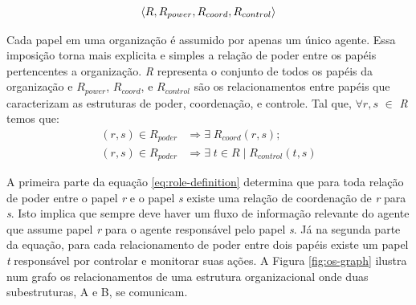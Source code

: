         \begin{equation}
            \centering
            \label{eq:os-structure}
            \langle  R, R_{power}, R_{coord}, R_{control}  \rangle
        \end{equation}
        
        Cada papel em uma organização é assumido por apenas um único agente. Essa imposição torna mais explicita e simples a relação de poder entre os papéis pertencentes a organização. %
        \emph{R} representa o conjunto de todos os papéis da organização e $R_{power}$,  $R_{coord}$, e $R_{control}$ são os relacionamentos entre papéis que caracterizam as estruturas de poder, coordenação, e controle. Tal que, $\forall{r, s}$ $\in$ \emph{R} temos que:
        \begin{equation}
            \label{eq:role-definition}
            \begin{split}
                 (r, s)  \in R_{poder} &\Rightarrow \exists \; R_{coord}(r, s);\\
                 (r, s)  \in R_{poder} &\Rightarrow \exists \;  t \in R \; | \; R_{control}(t, s)
            \end{split}
        \end{equation}
        
        A primeira parte da equação \ref{eq:role-definition} determina que para toda relação de poder entre o papel \emph{r} e o papel \emph{s} existe uma relação de coordenação de \emph{r} para \emph{s}. Isto implica que sempre deve haver um fluxo de informação relevante do agente que assume papel \emph{r} para o agente responsável pelo papel \emph{s}. Já na segunda parte da equação, para cada relacionamento de poder entre dois papéis existe um papel \emph{t} responsável por controlar e monitorar suas ações. A Figura \ref{fig:os-graph} ilustra num grafo os relacionamentos de uma estrutura organizacional onde duas subestruturas, A e B, se comunicam. 
        
